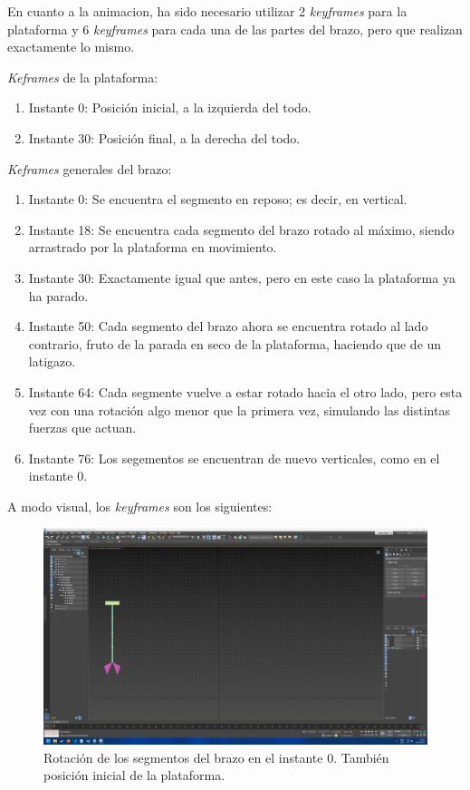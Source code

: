 \documentclass{article}
\begin{document}
En cuanto a la animacion, ha sido necesario utilizar 2 \textit{keyframes} para la plataforma y 6 \textit{keyframes} para cada una de las partes del brazo, pero que realizan exactamente lo mismo. 

\textit{Keframes} de la plataforma:


\begin{enumerate}
    \item Instante 0: Posición inicial, a la izquierda del todo.
    \item Instante 30: Posición final, a la derecha del todo.
\end{enumerate}

\textit{Keframes} generales del brazo:

\begin{enumerate}
    \item Instante 0: Se encuentra el segmento en reposo; es decir, en vertical.
    \item Instante 18: Se encuentra cada segmento del brazo rotado al máximo, siendo arrastrado por la plataforma en movimiento.
    \item Instante 30: Exactamente igual que antes, pero en este caso la plataforma ya ha parado.
    \item Instante 50: Cada segmento del brazo ahora se encuentra rotado al lado contrario, fruto de la parada en seco de la plataforma, haciendo que de un latigazo.
    \item Instante 64: Cada segmente vuelve a estar rotado hacia el otro lado, pero esta vez con una rotación algo menor que la primera vez, simulando las distintas fuerzas que actuan.
    \item Instante 76: Los segementos se encuentran de nuevo verticales, como en el instante 0.
\end{enumerate}

A modo visual, los \textit{keyframes} son los siguientes:

\begin{figure}[H]
    \centering
    \includegraphics[width=\textwidth]{imagenes/Ejercicio4/keyframes/0.png}
    \caption{Rotación de los segmentos del brazo en el instante 0. También posición inicial de la plataforma.}
\end{figure}
\end{document}
